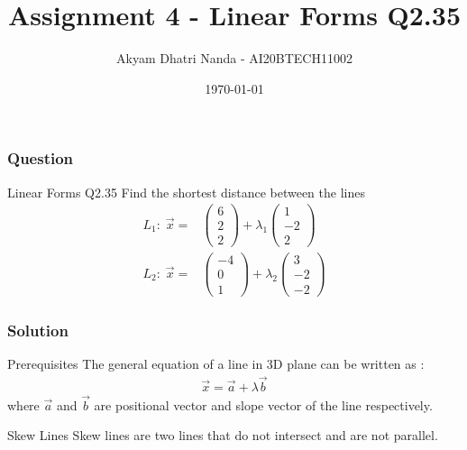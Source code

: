 \documentclass{beamer}
\title{Assignment 4 - Linear Forms Q2.35}
\author{Akyam Dhatri Nanda - AI20BTECH11002}
\date{\today }
\newcommand{\myvec}[1]{\ensuremath{\begin{pmatrix}#1\end{pmatrix}}}
\begin{document}
\begin{frame}
\titlepage
\end{frame}

\begin{frame}
\frametitle{Question}
\begin{block}{Linear Forms Q2.35}
Find the shortest distance between the lines
\begin{align}
\label{eq:1}
 L_{1}: \; \Vec{x} ={}& \myvec{6 \\ 2\\ 2 } +\lambda_{1}\myvec{1 \\ -2 \\ 2}\\
 \label{eq:2}
 L_{2}: \; \Vec{x} ={}& \myvec{-4 \\ 0\\ 1} + \lambda_{2}\myvec{3 \\ -2 \\ -2} 
\end{align}
\end{block}
\end{frame}

\begin{frame}
\frametitle{Solution}
\begin{block}{Prerequisites}
The general equation of a line in 3D plane can be written as :
\begin{align}
\Vec{x}= \Vec{a}+\lambda\Vec{b} \label{eq:3}  
\end{align}
where $\Vec{a}$ and $\Vec{b}$ are positional vector and slope vector of the line respectively.\\

\end{block}
\begin{block}{Skew Lines}
Skew lines are two lines that do not intersect and are not parallel.
\end{block}

\end{frame}
\end{document}
